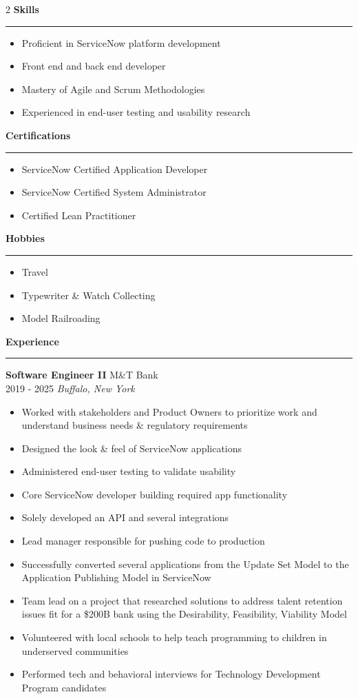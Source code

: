 \documentclass[a4paper,10pt]{article}
\newcommand{\sect}[1]{\vspace{9pt}\textbf{\large #1}\vspace{-10pt}\par\textcolor{maincolor}{\rule{\linewidth}{0.8pt}}\vspace{4pt}}
\begin{document}
\begin{paracol}{2}
\sect{Skills}
\begin{itemize}
    \item Proficient in ServiceNow platform development
    \item Front end and back end developer
    \item Mastery of Agile and Scrum Methodologies
    \item Experienced in end-user testing and usability research
\end{itemize}

\sect{Certifications}
\begin{itemize}
    \item ServiceNow Certified Application Developer
    \item ServiceNow Certified System Administrator
    \item Certified Lean Practitioner
\end{itemize}

\sect{Hobbies}
\begin{itemize}
    \item Travel
    \item Typewriter \& Watch Collecting
    \item Model Railroading
\end{itemize}

\switchcolumn


\sect{Experience}

\textbf{Software Engineer II} \hfill M\&T Bank\\
2019 - 2025 \hfill \textit{Buffalo, New York}\par
\begin{itemize}
    \item Worked with stakeholders and Product Owners to prioritize work and understand business needs \& regulatory requirements
    \item Designed the look \& feel of ServiceNow applications
    \item Administered end-user testing to validate usability
    \item Core ServiceNow developer building required app functionality
    \item Solely developed an API and several integrations
    \item Lead manager responsible for pushing code to production
    \item Successfully converted several applications from the Update Set Model to the Application Publishing Model in ServiceNow
    \item Team lead on a project that researched solutions to address talent retention issues fit for a \$200B bank using the Desirability, Feasibility, Viability Model
    \item Volunteered with local schools to help teach programming to children in underserved communities
    \item Performed tech and behavioral interviews for Technology Development Program candidates
\end{itemize}
\medskip


\end{paracol}
\end{document}
